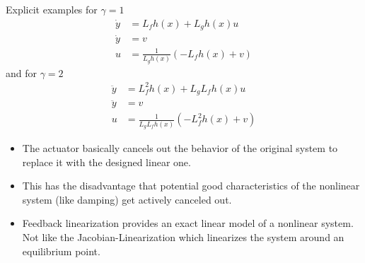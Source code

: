 \newpar{}
Explicit examples for $\gamma = 1$
\begin{align*}
    \dot{y} & = L_f h(x) + L_g h(x) u             \\
    \dot{y} & = v                                 \\
    u       & = \frac{1}{L_g h(x)}(-L_f h(x) + v)
\end{align*}
and for $\gamma = 2$
\begin{align*}
    \ddot{y} & = L_f^2 h(x) + L_g L_f h(x) u             \\
    \ddot{y} & = v                                       \\
    u        & = \frac{1}{L_g L_f h(x)}(-L_f^2 h(x) + v)
\end{align*}

\newpar{}
\begin{itemize}
    \item The actuator basically cancels out the behavior of the original system to replace it with the designed linear one.
    \item This has the disadvantage that potential good characteristics of the nonlinear system (like damping) get actively canceled out.
    \item Feedback linearization provides an exact linear model of a nonlinear system. Not like the Jacobian-Linearization which linearizes the system around an equilibrium point.
\end{itemize}

